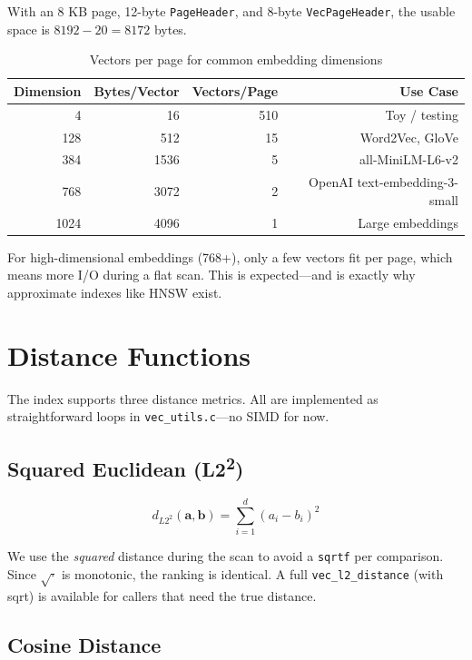 \documentclass[12pt, a4paper]{report}
\begin{document}
With an 8 KB page, 12-byte \texttt{PageHeader}, and 8-byte
\texttt{VecPageHeader}, the usable space is $8192 - 20 = 8172$ bytes.

\begin{table}[h]
\centering
\begin{tabular}{rrrr}
\toprule
\textbf{Dimension} & \textbf{Bytes/Vector} & \textbf{Vectors/Page} & \textbf{Use Case} \\
\midrule
4   & 16   & 510 & Toy / testing \\
128 & 512  & 15  & Word2Vec, GloVe \\
384 & 1536 & 5   & all-MiniLM-L6-v2 \\
768 & 3072 & 2   & OpenAI text-embedding-3-small \\
1024 & 4096 & 1  & Large embeddings \\
\bottomrule
\end{tabular}
\caption{Vectors per page for common embedding dimensions}
\end{table}

For high-dimensional embeddings (768+), only a few vectors fit per page,
which means more I/O during a flat scan. This is expected---and is exactly
why approximate indexes like HNSW exist.


\section{Distance Functions}

The index supports three distance metrics. All are implemented as
straightforward loops in \texttt{vec\_utils.c}---no SIMD for now.

\subsection{Squared Euclidean (L2\textsuperscript{2})}

\[
d_{L2^2}(\mathbf{a}, \mathbf{b}) = \sum_{i=1}^{d} (a_i - b_i)^2
\]

We use the \textit{squared} distance during the scan to avoid a
\texttt{sqrtf} per comparison. Since $\sqrt{\cdot}$ is monotonic, the
ranking is identical. A full \texttt{vec\_l2\_distance} (with sqrt) is
available for callers that need the true distance.

\subsection{Cosine Distance}
\end{document}
